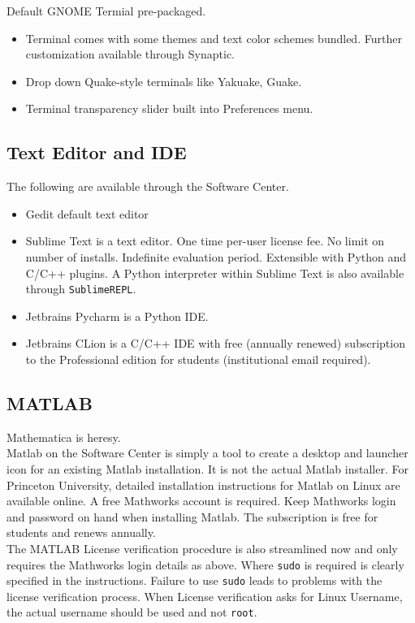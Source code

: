 \documentclass[10pt,letterpaper,twocolumn]{article}
\begin{document}
Default GNOME Termial pre-packaged.

\begin{itemize}
	\item Terminal comes with some themes and text color schemes bundled. Further customization available through Synaptic.
	\item Drop down Quake-style terminals like Yakuake, Guake.
	\item Terminal transparency slider built into Preferences menu.
\end{itemize}

\subsection{Text Editor and IDE}
The following are available through the Software Center.

\begin{itemize}
	\item Gedit default text editor
	\item Sublime Text is a text editor. One time per-user license fee. No limit on number of installs. Indefinite evaluation period. Extensible with Python and C/C++ plugins. A Python interpreter within Sublime Text is also available through \texttt{SublimeREPL}. 
	\item Jetbrains Pycharm is a Python IDE.
	\item Jetbrains CLion is a C/C++ IDE with free (annually renewed) subscription to the Professional edition for students (institutional email required).
\end{itemize}

\subsection{MATLAB}

Mathematica is heresy.\\

Matlab on the Software Center is simply a tool to create a desktop and launcher icon for an existing Matlab installation. It is not the actual Matlab installer.
For Princeton University, detailed installation instructions for Matlab on Linux are available online. A free Mathworks account is required. Keep Mathworks login and password on hand when installing Matlab. The subscription is free for students and renews annually.\\

The MATLAB License verification procedure is also streamlined now and only requires the Mathworks login details as above. Where \texttt{sudo} is required is clearly specified in the instructions. Failure to use \texttt{sudo} leads to problems with the license verification process. When License verification asks for Linux Username, the actual username should be used and not \texttt{root}.\\
\end{document}
